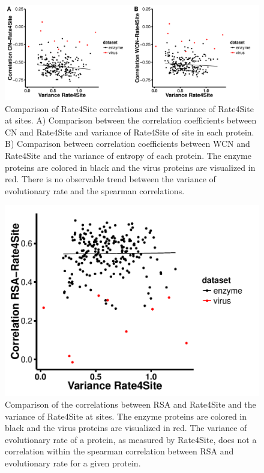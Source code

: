\documentclass[12pt]{article}
\begin{document}
        \begin{figure}[H]
            \centerline{\includegraphics[width=7.5in]{rate_cor.pdf}}     
            \caption{Comparison of Rate4Site correlations and the variance of Rate4Site at sites. A) Comparison between the correlation coefficients between CN and Rate4Site and variance of Rate4Site of site in each protein. B) Comparison between correlation coefficients between WCN and Rate4Site and the variance of entropy of each protein. The enzyme proteins are colored in black and the virus proteins are visualized in red. There is no observable trend between the variance of evolutionary rate and the spearman correlations. }
            \label{fig:var_rate_cor}
    \end{figure}
        
            \begin{figure}[H]
            \centerline{\includegraphics[width=5.0in]{var_rate_rsa_cor.pdf}}     
            \caption{Comparison of the correlations between RSA and Rate4Site and the variance of Rate4Site at sites. The enzyme proteins are colored in black and the virus proteins are visualized in red. The variance of evolutionary rate of a protein, as measured by Rate4Site, does not a correlation within the spearman correlation between RSA and evolutionary rate for a given protein.}
            \label{fig:var_rate_rsa_cor}
    \end{figure}
    
\end{document}
